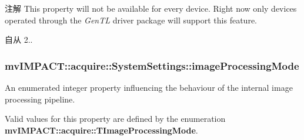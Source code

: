 \begin{DoxyNote}{注解}
This property will not be available for every device. Right now only devices operated through the {\itshape Gen\+T\+L} driver package will support this feature.
\end{DoxyNote}
\begin{DoxySince}{自从}
2.. 
\end{DoxySince}
\hypertarget{classmv_i_m_p_a_c_t_1_1acquire_1_1_system_settings_a0e9c91668ae90fb631d5d69c32395fce}{
\subsubsection[{image\+Processing\+Mode}]{ mv\+I\+M\+P\+A\+C\+T\+::acquire\+::\+System\+Settings\+::image\+Processing\+Mode}}\label{classmv_i_m_p_a_c_t_1_1acquire_1_1_system_settings_a0e9c91668ae90fb631d5d69c32395fce}


An enumerated integer property influencing the behaviour of the internal image processing pipeline. 

Valid values for this property are defined by the enumeration {\bfseries mv\+I\+M\+P\+A\+C\+T\+::acquire\+::\+T\+Image\+Processing\+Mode}.

